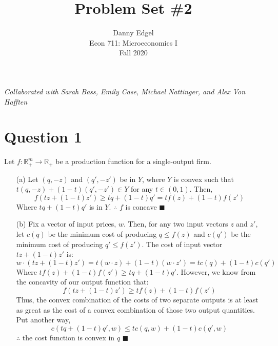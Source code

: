 \documentclass{article}
\newcommand{\R}{\mathbb{R}}
\begin{document}
\title{	Problem Set \#2 }
\author{ 	Danny Edgel 					\\ 
			Econ 711: Microeconomics I		\\
			Fall 2020						\\
		}
\maketitle\thispagestyle{empty}

\noindent\textit{Collaborated with Sarah Bass, Emily Case, Michael Nattinger, and Alex Von Hafften}


\section*{Question 1}
Let $f:\R_+^m\rightarrow\R_+$ be a production function for a single-output firm.
\begin{itemize}
	\item[(a)] Let $(q,-z)$ and $(q',-z')$ be in $Y$, where $Y$ is convex such that $t(q,-z)+(1-t)(q',-z')\in Y$ for any $t\in(0,1)$. Then,
		\[
			f(tz + (1-t)z') \geq tq + (1-t)q' = tf(z) + (1-t)f(z')
		\]
		Where $tq + (1-t)q'$ is in $Y$.  $\therefore$ $f$ is concave $\blacksquare$
		
	\item[(b)] Fix a vector of input prices, $w$. Then, for any two input vectors $z$ and $z'$, let $c(q)$ be the minimum cost of producing $q\leq f(z)$ and $c(q')$ be the minimum cost of producing $q'\leq f(z')$. The cost of input vector $tz + (1-t)z'$ is:
		\[
			w\cdot(tz + (1-t)z')=t(w\cdot z) + (1-t)(w\cdot z')=tc(q) + (1-t)c(q')
		\]
		Where $tf(z) + (1-t)f(z')\geq tq + (1-t)q'$. However, we know from the concavity of our output function that: 
		\[
			f(tz + (1-t)z') \geq tf(z) + (1-t)f(z')
		\]
		Thus, the convex combination of the costs of two separate outputs is at least as great as the cost of a convex combination of those two output quantities. Put another way,
		\[
			c(tq+(1-t)q',w)\leq tc(q,w) + (1-t)c(q',w)
		\]
		$\therefore$ the cost function is convex in $q$ $\blacksquare$
\end{itemize}	

\end{document}
